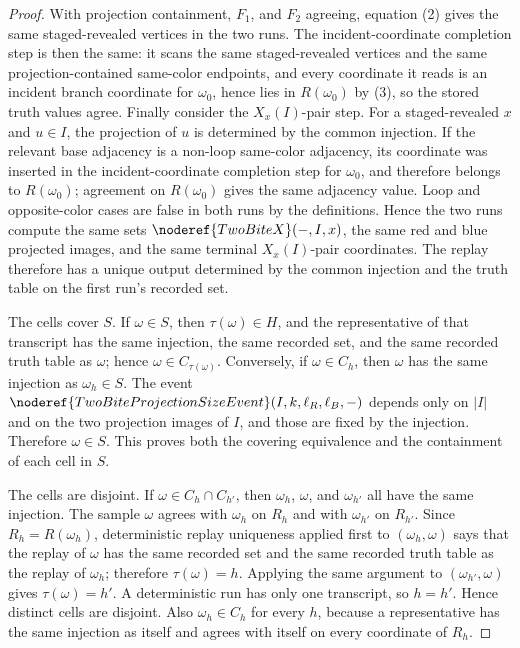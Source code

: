 \begin{proof}
With projection containment, \(F_1\), and \(F_2\) agreeing, equation (2) gives
the same staged-revealed vertices in the two runs.  The incident-coordinate
completion step is then the same: it scans the same staged-revealed vertices
and the same projection-contained same-color endpoints, and every coordinate
it reads is an incident branch coordinate for \(\omega_0\), hence lies in
\(R(\omega_0)\) by (3), so the stored truth values agree.  Finally consider
the \(X_x(I)\)-pair step.  For a staged-revealed \(x\) and \(u\in I\), the
projection of \(u\) is determined by the common injection.  If the relevant
base adjacency is a non-loop same-color adjacency, its coordinate was inserted
in the incident-coordinate completion step for \(\omega_0\), and therefore
belongs to \(R(\omega_0)\); agreement on \(R(\omega_0)\) gives the same
adjacency value.  Loop and opposite-color cases are false in both runs by the
definitions.  Hence the two runs compute the same sets
\(\noderef{TwoBiteX}(-,I,x)\), the same red and blue projected images, and the
same terminal \(X_x(I)\)-pair coordinates.  The replay therefore has a unique
output determined by the common injection and the truth table on the first
run's recorded set.

The cells cover \(S\).  If \(\omega\in S\), then
\(\tau(\omega)\in H\), and the representative of that transcript has the same
injection, the same recorded set, and the same recorded truth table as
\(\omega\); hence \(\omega\in C_{\tau(\omega)}\).  Conversely, if
\(\omega\in C_h\), then \(\omega\) has the same injection as
\(\omega_h\in S\).  The event
\(\noderef{TwoBiteProjectionSizeEvent}(I,k,\ell_R,\ell_B,-)\) depends only on
\(|I|\) and on the two projection images of \(I\), and those are fixed by the
injection.  Therefore \(\omega\in S\).  This proves both the covering
equivalence and the containment of each cell in \(S\).

The cells are disjoint.  If \(\omega\in C_h\cap C_{h'}\), then
\(\omega_h\), \(\omega\), and \(\omega_{h'}\) all have the same injection.
The sample \(\omega\) agrees with \(\omega_h\) on \(R_h\) and with
\(\omega_{h'}\) on \(R_{h'}\).  Since \(R_h=R(\omega_h)\), deterministic
replay uniqueness applied first to \((\omega_h,\omega)\) says that the replay
of \(\omega\) has the same recorded set and the same recorded truth table as
the replay of \(\omega_h\); therefore \(\tau(\omega)=h\).  Applying the same
argument to \((\omega_{h'},\omega)\) gives \(\tau(\omega)=h'\).  A
deterministic run has only one transcript, so \(h=h'\).  Hence distinct cells
are disjoint.  Also
\(\omega_h\in C_h\) for every \(h\), because a representative has the same
injection as itself and agrees with itself on every coordinate of \(R_h\).


\end{proof}
